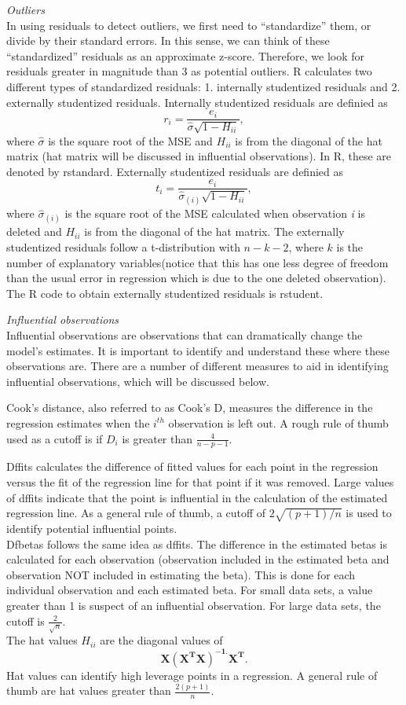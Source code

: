 \documentclass[
  letterpaper,
  DIV=11,
  numbers=noendperiod]{scrreprt}
\begin{document}
\emph{Outliers}\\
In using residuals to detect outliers, we first need to ``standardize''
them, or divide by their standard errors. In this sense, we can think of
these ``standardized'' residuals as an approximate z-score. Therefore,
we look for residuals greater in magnitude than 3 as potential outliers.
R calculates two different types of standardized residuals: 1.
internally studentized residuals and 2. externally studentized
residuals. Internally studentized residuals are definied as
\[ r_{i}=\frac{e_{i}}{\hat\sigma\sqrt{1-H_{ii}}},\] where \(\hat\sigma\)
is the square root of the MSE and \(H_{ii}\) is from the diagonal of the
hat matrix (hat matrix will be discussed in influential observations).
In R, these are denoted by rstandard. Externally studentized residuals
are definied as
\[ t_{i}=\frac{e_{i}}{\hat\sigma_{(i)}\sqrt{1-H_{ii}}},\] where
\(\hat\sigma_{(i)}\) is the square root of the MSE calculated when
observation \emph{i} is deleted and \(H_{ii}\) is from the diagonal of
the hat matrix. The externally studentized residuals follow a
t-distribution with \(n-k-2\), where \(k\) is the number of explanatory
variables(notice that this has one less degree of freedom than the usual
error in regression which is due to the one deleted observation). The R
code to obtain externally studentized residuals is rstudent.

\emph{Influential observations}\\
Influential observations are observations that can dramatically change
the model's estimates. It is important to identify and understand these
where these observations are. There are a number of different measures
to aid in identifying influential observations, which will be discussed
below.

Cook's distance, also referred to as Cook's D, measures the difference
in the regression estimates when the \(i^{th}\) observation is left out.
A rough rule of thumb used as a cutoff is if \(D_{i}\) is greater than
\(\frac{4}{n-p-1}\).

Dffits calculates the difference of fitted values for each point in the
regression versus the fit of the regression line for that point if it
was removed. Large values of dffits indicate that the point is
influential in the calculation of the estimated regression line. As a
general rule of thumb, a cutoff of \(2\sqrt{(p+1)/n}\) is used to
identify potential influential points.\\
Dfbetas follows the same idea as dffits. The difference in the estimated
betas is calculated for each observation (observation included in the
estimated beta and observation NOT included in estimating the beta).
This is done for each individual observation and each estimated beta.
For small data sets, a value greater than 1 is suspect of an influential
observation. For large data sets, the cutoff is
\(\frac{2}{\sqrt{n}}\).\\
The hat values \(H_{ii}\) are the diagonal values of
\[\boldsymbol{X(X^{T}X)^{-1.}X^{T}}.\] Hat values can identify high
leverage points in a regression. A general rule of thumb are hat values
greater than \(\frac{2(p+1)}{n}\).
\end{document}
